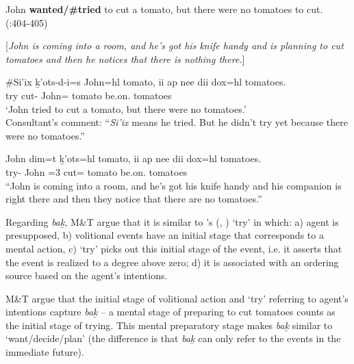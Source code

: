 \documentclass[output=paper]{langscibook}
\begin{document}
\begin{exe}
\ex \label{Todoro41}
John \textbf{wanted/\#tried} to cut a tomato, but there were no tomatoes to cut.
	\\(\citealt{sharvit2003a}:404-405)
\end{exe}

\begin{exe}
\ex \label{Todoro42} 
[\emph{John is coming into a room, and he’s got his knife handy and is 	planning to cut tomatoes and then he notices that there is 	nothing there.}]
\begin{xlist}

\ex \label{Todoro42a}
\gll \#{Si'ix} {ḵ’ots-d-i=s}	{John=hl} {tomato,} {ii}  {ap}  {nee}  {dii}  {dox=hl}  {tomatoes}. \\
    try    cut- 	John= tomato  	   be.on. 	tomatoes\\
\glt `John tried to cut a tomato, but there were no tomatoes.’\\
{Consultant’s comment}: “\textit{Si'ix} means he tried. But he didn’t try yet because there were no tomatoes.”
 

\ex \label{Todoro42b}
   {John} {dim=t}        {ḵ’ots=hl}  {	tomato, } {ii}  {ap}  {nee}  {dii}  {dox=hl}  {tomatoes}. \\
    try-    John =3{\seriesI} cut= tomato  	   be.on. 	tomatoes\\
 ``John is coming into a room,   
     and he’s got his knife handy and his companion is right there and 
     then they notice that there are no tomatoes.''

\end{xlist}
\end{exe}

Regarding \emph{bak̲}, M\&T argue that it is similar to \citeauthor{grano2011a}’s (\citeyear{grano2011a}, \citeyear{grano2017a}) ‘try’ in which: a) agent is presupposed, b) volitional events have an initial stage that corresponds to a mental action, c) ‘try’ picks out this initial stage of the event, i.e. it asserts that the event is realized to a degree above zero; d) it is associated with an ordering source based on the agent’s intentions. 

M\&T argue that the initial stage of volitional action and ‘try’ referring to agent’s intentions capture \emph{bak̲} – a mental stage of preparing to cut tomatoes counts as the initial stage of trying. This mental preparatory stage makes \emph{bak̲} similar to ‘want/decide/plan’ (the difference is that \emph{bak̲} can only refer to the events in the immediate future). 
\end{document}
